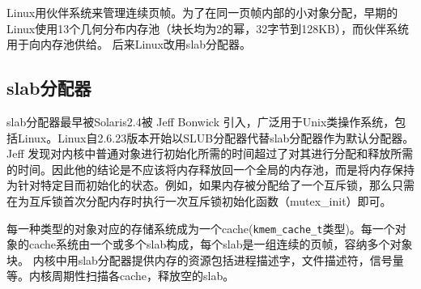 Linux用伙伴系统来管理连续页帧。为了在同一页帧内部的小对象分配，早期的Linux使用13个几何分布内存池（块长均为2的幂，32字节到128KB），而伙伴系统用于向内存池供给。
后来Linux改用slab分配器。

\subsection{slab分配器}
slab分配器最早被Solaris2.4被 Jeff Bonwick 引入，广泛用于Unix类操作系统，包括Linux。Linux自2.6.23版本开始以SLUB分配器代替slab分配器作为默认分配器。
Jeff 发现对内核中普通对象进行初始化所需的时间超过了对其进行分配和释放所需的时间。因此他的结论是不应该将内存释放回一个全局的内存池，而是将内存保持为针对特定目而初始化的状态。例如，如果内存被分配给了一个互斥锁，那么只需在为互斥锁首次分配内存时执行一次互斥锁初始化函数（mutex\_init）即可。

每一种类型的对象对应的存储系统成为一个cache(\verb$kmem_cache_t$类型)。每一个对象的cache系统由一个或多个slab构成，每个slab是一组连续的页帧，容纳多个对象块。
内核中用slab分配器提供内存的资源包括进程描述字，文件描述符，信号量等。内核周期性扫描各cache，释放空的slab。

